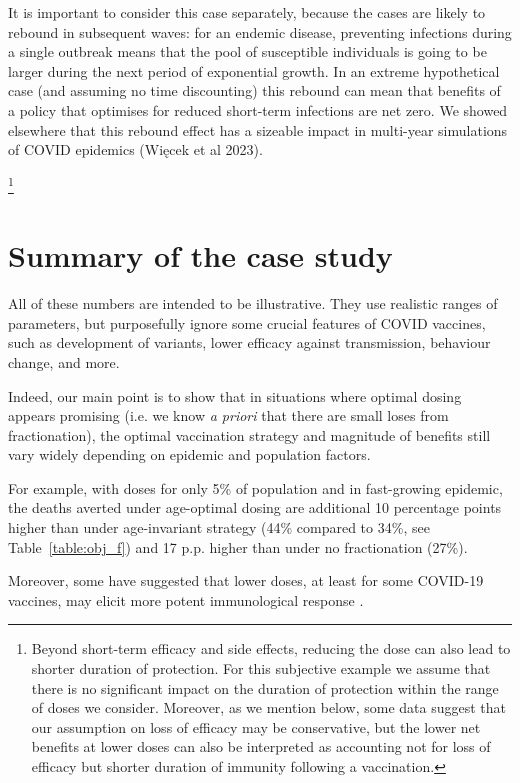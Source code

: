\documentclass[12pt]{article}
\begin{document}
It is important to consider this case separately, because the cases are likely to rebound in subsequent waves: for an endemic disease, preventing infections during a single outbreak means that the pool of susceptible individuals is going to be larger during the next period of exponential growth. In an extreme hypothetical case (and assuming no time discounting) this rebound can mean that benefits of a policy that optimises for reduced short-term infections are net zero. We showed elsewhere that this rebound effect has a sizeable impact in multi-year simulations of COVID epidemics (Więcek et al 2023).


\footnote{Beyond short-term efficacy and side effects, reducing the dose can also lead to shorter duration of protection. For this subjective example we assume that there is no significant impact on the duration of protection within the range of doses we consider. Moreover, as we mention below, some data suggest that our assumption on loss of efficacy may be conservative, but the lower net benefits at lower doses can also be interpreted as accounting not for loss of efficacy but shorter duration of immunity following a vaccination.}



\section{Summary of the case study}

All of these numbers are intended to be illustrative. They use realistic ranges of parameters, but purposefully ignore some crucial features of COVID vaccines, such as development of variants, lower efficacy against transmission, behaviour change, and more. 

Indeed, our main point is to show that in situations where optimal dosing appears promising (i.e. we know \textit{a priori} that there are small loses from fractionation), the optimal vaccination strategy and magnitude of benefits still vary widely depending on epidemic and population factors. 


For example, with doses for only 5\% of population and in fast-growing epidemic, the deaths averted under age-optimal dosing are additional 10 percentage points higher than under age-invariant strategy (44\% compared to 34\%, see Table~\ref{table:obj_f}) and 17 p.p. higher than under no fractionation (27\%). 


\pagebreak


Moreover, some have suggested that lower doses, at least for some COVID-19 vaccines, may elicit more potent immunological response \cite{sanchez_limiting_2021}.
\end{document}
